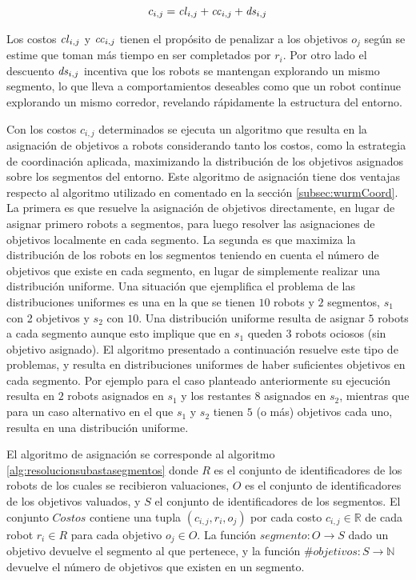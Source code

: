 \begin{equation} 
  c_{i,j} = \mathit{cl}_{i,j} + \mathit{cc}_{i,j} + \mathit{ds}_{i,j}
  \label{eq:costoTot}
\end{equation}

Los costos $\mathit{cl}_{i,j}$ y $\mathit{cc}_{i,j}$ tienen el propósito de penalizar
a los objetivos $o_j$ según se estime que toman más tiempo en ser completados
por $r_i$. Por otro lado el descuento $\mathit{ds}_{i,j}$ incentiva que los robots
se mantengan explorando un mismo segmento, lo que lleva a comportamientos
deseables como que un robot continue explorando un mismo corredor, revelando
rápidamente la estructura del entorno.

Con los costos $c_{i,j}$ determinados se ejecuta un algoritmo que resulta
en la asignación de objetivos a robots considerando tanto los costos, como la
estrategia de coordinación aplicada, maximizando la
distribución de los objetivos asignados sobre los segmentos del entorno. Este
algoritmo de asignación tiene dos ventajas respecto al
algoritmo utilizado en \cite{wurm2008coordinated} comentado en la sección
\ref{subsec:wurmCoord}. La primera es que resuelve la asignación de objetivos
directamente, en lugar de asignar primero robots a segmentos, para luego
resolver las asignaciones de objetivos localmente en cada segmento. La segunda
es que maximiza la distribución de los robots en los segmentos teniendo en cuenta 
el número de objetivos que existe en cada segmento, en lugar de simplemente
realizar una distribución uniforme. Una situación que ejemplifica el problema
de las distribuciones uniformes es una en la que se tienen $10$ robots y $2$
segmentos, $s_1$ con 2 objetivos y $s_2$ con $10$. Una distribución uniforme
resulta de asignar $5$ robots a cada segmento aunque esto implique que en $s_1$
queden $3$ robots ociosos (sin objetivo asignado). El algoritmo presentado a
continuación resuelve este tipo de problemas, y resulta en distribuciones
uniformes de haber suficientes objetivos en cada segmento. Por ejemplo para el
caso planteado anteriormente su ejecución resulta en $2$ robots asignados en
$s_1$ y los restantes $8$ asignados en $s_2$, mientras que para un caso
alternativo en el que $s_1$ y $s_2$ tienen $5$ (o más) objetivos cada uno,
resulta en una distribución uniforme.

El algoritmo de asignación se corresponde al algoritmo
\ref{alg:resolucionsubastasegmentos} donde $R$ es el conjunto de
identificadores de los robots de los cuales se recibieron valuaciones, $O$ es
el conjunto de identificadores de los objetivos valuados, y $S$ el conjunto de
identificadores de los segmentos. El conjunto $Costos$ contiene una tupla
$(c_{i,j},r_i,o_j)$ por cada costo $c_{i,j}\in \mathds{R}$ de cada robot $r_i\in R$ para cada objetivo
$o_j\in O$. La función $segmento : O \rightarrow S$ dado un objetivo devuelve el
segmento al que pertenece, y la función $\#objetivos : S \rightarrow \mathds{N}$
devuelve el número de objetivos que existen en un segmento.

